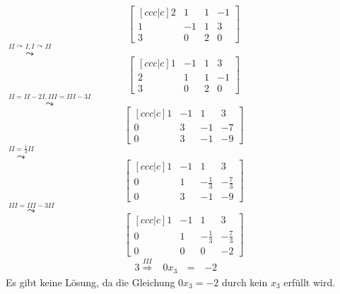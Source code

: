 \documentclass[10pt,a4paper,oneside,ngerman,numbers=noenddot]{scrartcl}
\begin{document}
\subsection{} %
\[
\begin{bmatrix}[ccc|c]
2 & 1 & 1 & -1 \\
1 & -1 & 1 & 3 \\
3 & 0 & 2 & 0
\end{bmatrix}
\]
$\overset{II \curvearrowright I, I \curvearrowright II}{\leadsto}$
\[
\begin{bmatrix}[ccc|c]
1 & -1 & 1 & 3 \\
2 & 1 & 1 & -1 \\
3 & 0 & 2 & 0
\end{bmatrix}
\]
$\overset{II = II - 2I, III = III - 3I}{\leadsto}$
\[
\begin{bmatrix}[ccc|c]
1 & -1 & 1 & 3 \\
0 & 3 & -1 & -7 \\
0 & 3 & -1 & -9
\end{bmatrix}
\]
$\overset{II = \frac{1}{3}II}{\leadsto}$
\[
\begin{bmatrix}[ccc|c]
1 & -1 & 1 & 3 \\
0 & 1 & -\frac{1}{3} & -\frac{7}{3} \\
0 & 3 & -1 & -9
\end{bmatrix}
\]
$\overset{III = III - 3II}{\leadsto}$
\[
\begin{bmatrix}[ccc|c]
1 & -1 & 1 & 3 \\
0 & 1 & -\frac{1}{3} & -\frac{7}{3} \\
0 & 0 & 0 & -2
\end{bmatrix}
\]
\begin{alignat*}{3}
\overset{III}{\Rightarrow} & 0x_{3} &\,=\,& -2 && 
\end{alignat*}
Es gibt keine Lösung, da die Gleichung $0x_{3} = - 2$ durch kein $x_{3}$ erfüllt wird.
\end{document}
